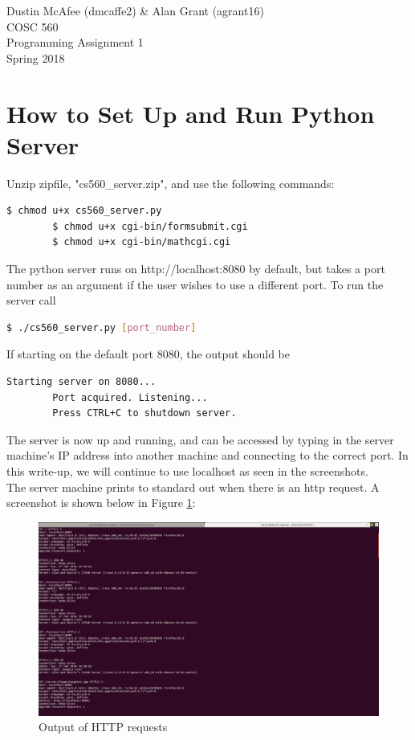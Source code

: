 \documentclass{article}
\begin{document}
\begin{center}
Dustin McAfee (dmcaffe2) \& Alan Grant (agrant16)\\
COSC 560 \\
Programming Assignment 1 \\
Spring 2018 \\
\end{center}

\section*{How to Set Up and Run Python Server}
\begin{center}
	Unzip zipfile, "cs560\_server.zip", and use the following commands: \\
	\begin{lstlisting}[language=bash, style=bash]
		$ chmod u+x cs560_server.py 
		$ chmod u+x cgi-bin/formsubmit.cgi
		$ chmod u+x cgi-bin/mathcgi.cgi
	\end{lstlisting}
	The python server runs on http://localhost:8080 by default, but takes a port number as an argument if the user wishes to use a different port. To run the server call \\
	\begin{lstlisting}[language=bash, style=bash]
		$ ./cs560_server.py [port_number]
	\end{lstlisting}
	If starting on the default port 8080, the output should be \\
	\begin{lstlisting}[language=bash, style=bash]
		Starting server on 8080...
		Port acquired. Listening...
		Press CTRL+C to shutdown server.
	\end{lstlisting}
\end{center}
The server is now up and running, and can be accessed by typing in the server machine's IP address into another machine and connecting to the correct port. In this write-up, we will continue to use localhost as seen in the screenshots. \\
The server machine prints to standard out when there is an http request. A screenshot is shown below in Figure \ref{fig:req}: \\
\begin{figure}[H]
	\includegraphics[width=\textwidth]{HttpResponse.png}
	\centering
	\caption{Output of HTTP requests}
	\label{fig:req}
\end{figure}
\end{document}
